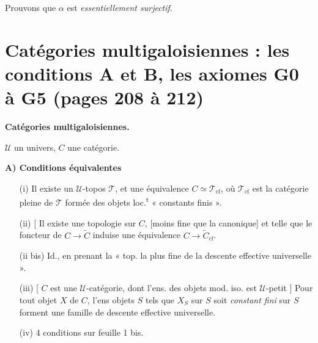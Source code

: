 \documentclass[11pt,a4paper]{article}
\begin{document}
Prouvons que $\alpha$ est \emph{essentiellement surjectif}.


\section*{Catégories multigaloisiennes : les conditions A et B, les axiomes G0 à G5 (pages 208 à 212)}



\textbf{Catégories multigaloisiennes.}

$\mathcal{U}$ un univers, $C$ une catégorie.

\textbf{A) Conditions équivalentes}

\begin{enumerate}
\item[(i)] Il existe un $\mathcal{U}$-topos $\mathcal{T}$, et une équivalence
$C \simeq \mathcal{T}_{\mathrm{cf}}$, où $\mathcal{T}_{\mathrm{cf}}$ est la
catégorie pleine de $\mathcal{T}$ formée des objets loc.\textsuperscript{t}
« constants finis ».

\item[(ii)]  [ Il existe une
topologie sur $C$, [moins fine que la canonique] et telle que le foncteur de
$C \longrightarrow \widetilde{C}$ induise une équivalence
$C \longrightarrow \widetilde{C}_{\mathrm{cf}}$.

\item[(ii bis)] Id., en prenant la « top. la plus fine de la descente
effective universelle ».

\item[(iii)] [ $C$ est une $\mathcal{U}$-catégorie, dont l'ens. des objets
mod. iso. est $\mathcal{U}$-petit ] Pour tout objet $X$ de $C$,
l'ens  objets $S$ tels que $X_S$ sur $S$ soit
\emph{constant fini} sur $S$ forment une famille  de
descente effective universelle.

\item[(iv)] 4 conditions sur feuille 1 bis.
\end{enumerate}
\end{document}
